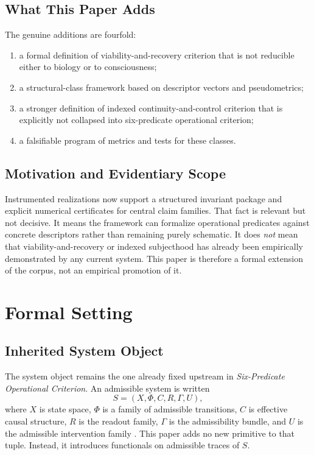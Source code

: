 \documentclass[11pt,a4paper]{article}
\theoremstyle{definition}
\begin{document}
\subsection{What This Paper Adds}
The genuine additions are fourfold:
\begin{enumerate}[leftmargin=1.5em]
\item a formal definition of viability-and-recovery criterion that is not reducible either to biology or to consciousness;
\item a structural-class framework based on descriptor vectors and pseudometrics;
\item a stronger definition of indexed continuity-and-control criterion that is explicitly not collapsed into six-predicate operational criterion;
\item a falsifiable program of metrics and tests for these classes.
\end{enumerate}

\subsection{Motivation and Evidentiary Scope}
Instrumented realizations now support a structured invariant package and explicit numerical certificates for central claim families. That fact is relevant but not decisive. It means the framework can formalize operational predicates against concrete descriptors rather than remaining purely schematic. It does \emph{not} mean that viability-and-recovery or indexed subjecthood has already been empirically demonstrated by any current system. This paper is therefore a formal extension of the corpus, not an empirical promotion of it.

\section{Formal Setting}
\subsection{Inherited System Object}
The system object remains the one already fixed upstream in \textit{Six-Predicate Operational Criterion}. An admissible system is written
\[
S=(X,\Phi,C,R,\Gamma,U),
\]
where $X$ is state space, $\Phi$ is a family of admissible transitions, $C$ is effective causal structure, $R$ is the readout family, $\Gamma$ is the admissibility bundle, and $U$ is the admissible intervention family \cite{paper5}. This paper adds no new primitive to that tuple. Instead, it introduces functionals on admissible traces of $S$.
\end{document}
